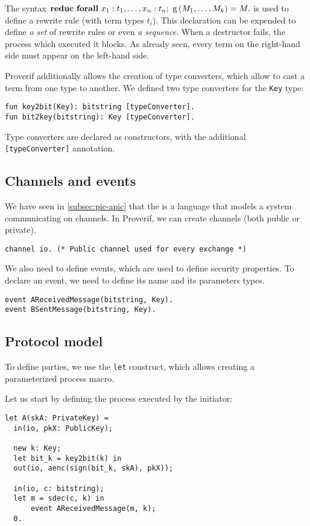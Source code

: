 The syntax $\mathbf{reduc\ forall}\ x_1: t_1, \ldots, x_n: t_n;\ \mbox{g}\left(M_1, \ldots, M_k\right) = M.$ is used to define a rewrite rule (with term types $t_i$). This declaration can be expended to define \textit{a set} of rewrite rules or even \textit{a sequence}. When a destructor fails, the process which executed it blocks. As already seen, every term on the right-hand side must appear on the left-hand side.

Proverif additionally allows the creation of type converters, which allow to cast a term from one type to another. We defined two type converters for the \lstinline{Key} type:

\begin{lstlisting}
fun key2bit(Key): bitstring [typeConverter].
fun bit2key(bitstring): Key [typeConverter].
\end{lstlisting}

Type converters are declared as constructors, with the additional \lstinline{[typeConverter]} annotation.

\subsection{Channels and events}
We have seen in \cref{subsec:pic-apic} that the \apic{} is a language that models a system communicating on channels. In Proverif, we can create channels (both public or private).

\begin{lstlisting}
channel io. (* Public channel used for every exchange *)
\end{lstlisting}

We also need to define events, which are used to define security properties. To declare an event, we need to define its name and its parameters types.

\begin{lstlisting}
event AReceivedMessage(bitstring, Key).
event BSentMessage(bitstring, Key).
\end{lstlisting}

\subsection{Protocol model}
To define parties, we use the \lstinline{let} construct, which allows creating a parameterized process macro.

Let us start by defining the process executed by the initiator:

\begin{lstlisting}
let A(skA: PrivateKey) =
  in(io, pkX: PublicKey);

  new k: Key;
  let bit_k = key2bit(k) in
  out(io, aenc(sign(bit_k, skA), pkX));
  
  in(io, c: bitstring);
  let m = sdec(c, k) in
      event AReceivedMessage(m, k);
  0.
\end{lstlisting}

